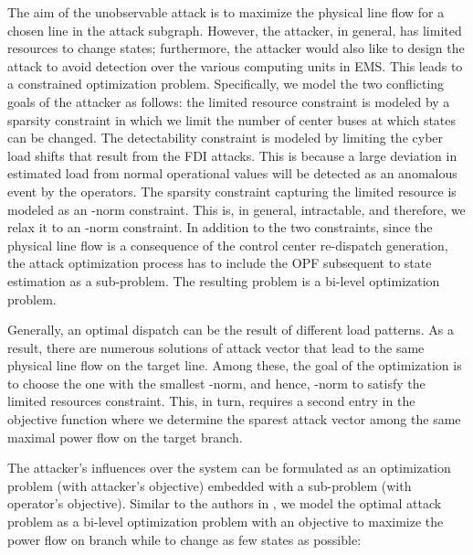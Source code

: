 \documentclass[twocolumn,english,final,journal]{IEEEtran}
\theoremstyle{plain}
\theoremstyle{definition}
\begin{document}
The aim of the unobservable attack is to maximize the physical line
flow for a chosen line in the attack subgraph. However, the attacker,
in general, has limited resources to change states; furthermore, the
attacker would also like to design the attack to avoid detection over
the various computing units in EMS. This leads to a constrained optimization
problem. Specifically, we model the two conflicting goals of the attacker
as follows: the limited resource constraint is modeled by a sparsity
constraint in which we limit the number of center buses at which states
can be changed. The detectability constraint is modeled by limiting
the cyber load shifts that result from the FDI attacks. This is because
a large deviation in estimated load from normal operational values
will be detected as an anomalous event by the operators. The sparsity
constraint capturing the limited resource is modeled as an -norm
constraint. This is, in general, intractable, and therefore, we relax
it to an -norm constraint. In addition to the two constraints,
since the physical line flow is a consequence of the control center
re-dispatch generation, the attack optimization process has to include
the OPF subsequent to state estimation as a sub-problem. The resulting
problem is a bi-level optimization problem.

Generally, an optimal dispatch can be the result of different load
patterns. As a result, there are numerous solutions of attack vector
that lead to the same physical line flow on the target line. Among
these, the goal of the optimization is to choose the one with the
smallest -norm, and hence, -norm to satisfy the limited
resources constraint. This, in turn, requires a second entry in the
objective function where we determine the sparest attack vector among
the same maximal power flow on the target branch.

The attacker's influences over the system can be formulated as an
optimization problem (with attacker's objective) embedded with a sub-problem
(with operator\textquoteright{}s objective). Similar to the authors
in , we model the optimal attack problem
as a bi-level optimization problem with an objective to maximize the
power flow on branch  while to change as few states as possible:
\end{document}
